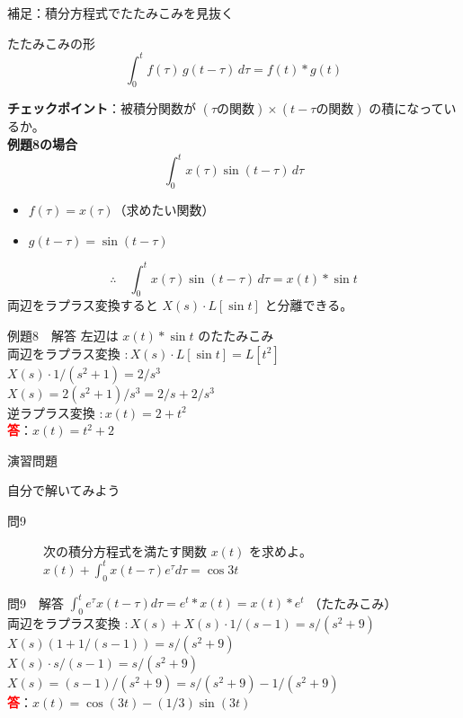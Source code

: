\documentclass[professionalfonts]{beamer}
\begin{document}
\begin{frame}{補足：積分方程式でたたみこみを見抜く}
  \begin{block}{たたみこみの形}
  \[
    \int_{0}^{t} f(\tau)\,g(t-\tau)\,d\tau = f(t) * g(t)
  \]
  \end{block}
  \textbf{チェックポイント}：被積分関数が $(\tau\text{の関数})\times(t-\tau\text{の関数})$ の積になっているか。\\[8pt]
  \textbf{例題8の場合}
  \[
    \int_{0}^{t} x(\tau)\sin(t-\tau)\,d\tau
  \]
  \begin{itemize}
    \item $f(\tau) = x(\tau)$（求めたい関数）
    \item $g(t-\tau) = \sin(t-\tau)$
  \end{itemize}
  \[
    \therefore\quad \int_{0}^{t} x(\tau)\sin(t-\tau)\,d\tau = x(t)*\sin t
  \]
  両辺をラプラス変換すると $X(s)\cdot L[\sin t]$ と分離できる。
\end{frame}

\begin{frame}{例題8　解答}
  左辺は $x(t) * \sin t$ のたたみこみ\\[4pt]
  両辺をラプラス変換 $: X(s) \cdot L[\sin t] = L[t^{2}]$\\[4pt]
  $X(s) \cdot 1/(s^{2}+1) = 2/s^{3}$\\[4pt]
  $X(s) = 2(s^{2}+1)/s^{3} = 2/s + 2/s^{3}$\\[4pt]
  逆ラプラス変換 $: x(t) = 2 + t^{2}$
  \\[8pt]\textcolor{red}{\textbf{答}}：$x(t) = t^{2} + 2$
\end{frame}

\begin{frame}{演習問題}
  \begin{exampleblock}{自分で解いてみよう}
  \begin{description}
    \item[問9] 次の積分方程式を満たす関数 $x(t)$ を求めよ。
    $x(t) + \int_{0}^t x(t-\tau)e^\tau d\tau = \cos 3t$\\
  \end{description}
  \end{exampleblock}
\end{frame}

\begin{frame}{問9　解答}
  $\int_{0}^t e^\tau x(t-\tau) d\tau = e^t * x(t) = x(t)*e^t$ （たたみこみ）\\[4pt]
  両辺をラプラス変換 $: X(s) + X(s)\cdot1/(s-1) = s/(s^{2}+9)$\\[4pt]
  $X(s)(1 + 1/(s-1)) = s/(s^{2}+9)$\\[4pt]
  $X(s)\cdot s/(s-1) = s/(s^{2}+9)$\\[4pt]
  $X(s) = (s-1)/(s^{2}+9) = s/(s^{2}+9) - 1/(s^{2}+9)$
  \\[8pt]\textcolor{red}{\textbf{答}}：$x(t) = \cos(3t) - (1/3)\sin(3t)$
\end{frame}
\end{document}
